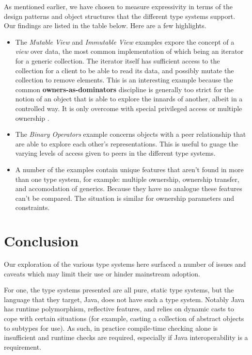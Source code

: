 \documentclass{acm_proc_article-sp}
\begin{document}
As mentioned earlier, we have chosen to measure expressivity in terms of the
design patterns and object structures that the different type systems support.
Our findings are listed in the table below. Here are a few highlights.

\begin{itemize}

	\item The \textit{Mutable View} and \textit{Immutable View} examples expore
		the concept of a \textit{view} over data, the most common implementation
		of which being an iterator for a generic collection. The iterator itself
		has sufficient access to the collection for a client to be able to read
		its data, and possibly mutate the collection to remove elements. This is
		an interesting example because the common \textbf{owners-as-dominators}
		discipline is generally too strict for the notion of an object that is
		able to explore the innards of another, albeit in a controlled way. It
		is only overcome with special privileged access
		\cite{boyapati04safejava} or multiple ownership \cite{cameron07mojo}.

    \item The \textit{Binary Operators} example concerns objects with a peer
        \cite{dietl11gut} relationship that are able to explore each other's
        representations. This is useful to guage the varying levels of access
		given to peers in the different type systems.

    \item A number of the examples contain unique features that aren't found in
        more than one type system, for example: multiple ownership, ownership
        transfer, and accomodation of generics. Because they have no analogue
        these features can't be compared. The situation is similar for ownership
		parameters and constraints.

\end{itemize}

\section{Conclusion}
\label{sec:conclusion}

Our exploration of the various type systems here surfaced a number of issues and
caveats which may limit their use or hinder mainstream adoption.

For one, the type systems presented are all pure, static type systems, but the
language that they target, Java, does not have such a type system. Notably Java
has runtime polymorphism, reflective features, and relies on dynamic casts to
cope with certain situations (for example, casting a collection of abstract
objects to subtypes for use). As such, in practice compile-time checking alone
is insufficient \cite{boyapati04safejava} and runtime checks are required,
especially if Java interoperability is a requirement.
\end{document}
